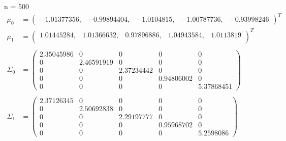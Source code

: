 \documentclass[12pt]{article}
\begin{document}
\begin{enumerate}[leftmargin=*]
    \vspace*{1cm}
    n = 500
    \begin{align*}
        \mu_0 &= \begin{pmatrix}
            -1.01377356, & -0.99894404, & -1.0104815, & -1.00787736, & -0.93998246
        \end{pmatrix}^T \\
        \mu_1 &= \begin{pmatrix}
            1.01445284, & 1.01366632, & 0.97896886, & 1.04943584, & 1.0113819 \\
        \end{pmatrix}^T \\ \\
        \Sigma_0 &= \begin{pmatrix}
            2.35045986 & 0 & 0 & 0 & 0 \\
            0 & 2.46591919 & 0 & 0 & 0 \\
            0 & 0 & 2.37234442 & 0 & 0 \\
            0 & 0 & 0 & 0.94806002 & 0 \\
            0 & 0 & 0 & 0 & 5.37868451 
        \end{pmatrix} \\ \\
        \Sigma_1 &= \begin{pmatrix}
            2.37126345 & 0 & 0 & 0 & 0 \\
            0 & 2.50692838 & 0 & 0 & 0 \\
            0 & 0 & 2.29197777 & 0 & 0 \\
            0 & 0 & 0 & 0.95968702 & 0 \\
            0 & 0 & 0 & 0 & 5.2598086
        \end{pmatrix}
    \end{align*}


\end{enumerate}
\end{document}
